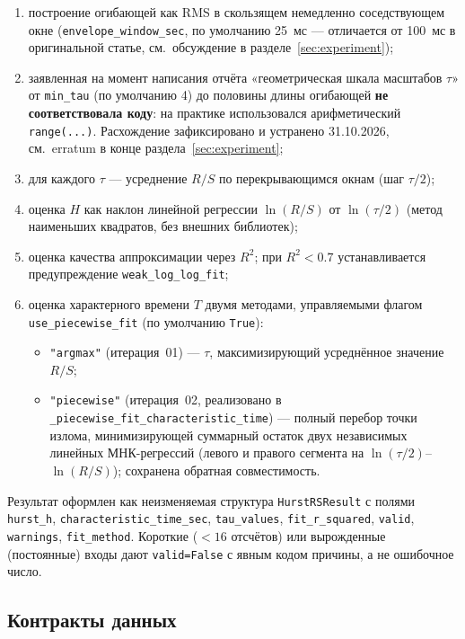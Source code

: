 \documentclass[12pt,a4paper]{article}
\begin{document}
\begin{enumerate}
  \item построение огибающей как RMS в скользящем немедленно соседствующем
    окне (\texttt{envelope\_window\_sec}, по умолчанию 25~мс — отличается
    от 100~мс в оригинальной статье, см.\ обсуждение в
    разделе~\ref{sec:experiment});
  \item заявленная на момент написания отчёта «геометрическая шкала
    масштабов $\tau$» от \texttt{min\_tau} (по умолчанию 4) до половины
    длины огибающей \textbf{не соответствовала коду}: на практике
    использовался арифметический \texttt{range(...)}. Расхождение
    зафиксировано и устранено 31.10.2026, см.\ erratum в конце
    раздела~\ref{sec:experiment};
  \item для каждого $\tau$ — усреднение $R/S$ по перекрывающимся окнам
    (шаг $\tau/2$);
  \item оценка $H$ как наклон линейной регрессии $\ln(R/S)$ от
    $\ln(\tau/2)$ (метод наименьших квадратов, без внешних библиотек);
  \item оценка качества аппроксимации через $R^2$; при $R^2<0.7$
    устанавливается предупреждение \texttt{weak\_log\_log\_fit};
  \item оценка характерного времени $T$ двумя методами, управляемыми флагом
   \texttt{use\_piecewise\_fit} (по умолчанию \texttt{True}):
   \begin{itemize}
     \item \texttt{"argmax"} (итерация~01) — $\tau$, максимизирующий
       усреднённое значение $R/S$;
     \item \texttt{"piecewise"} (итерация~02, реализовано в
       \texttt{\_piecewise\_fit\_characteristic\_time}) — полный перебор
       точки излома, минимизирующей суммарный остаток двух независимых
       линейных МНК-регрессий (левого и правого сегмента на
       $\ln(\tau/2)$--$\ln(R/S)$); сохранена обратная совместимость.
   \end{itemize}
\end{enumerate}

Результат оформлен как неизменяемая структура \texttt{HurstRSResult} с
полями \texttt{hurst\_h}, \texttt{characteristic\_time\_sec},
\texttt{tau\_values}, \texttt{fit\_r\_squared}, \texttt{valid},
\texttt{warnings}, \texttt{fit\_method}. Короткие ($<16$ отсчётов) или
вырожденные (постоянные) входы дают \texttt{valid=False} с явным кодом
причины, а не ошибочное число.

\subsection{Контракты данных}
\end{document}
